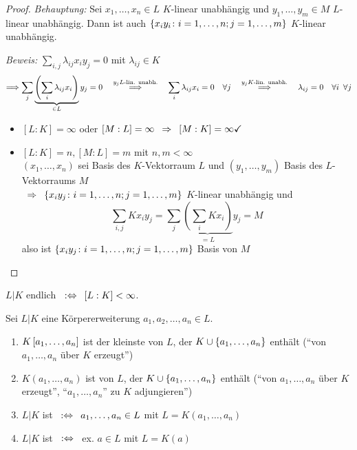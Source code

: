 \begin{proof}
    \textit{Behauptung:} Sei $x_1, \dots, x_n \in L$ $K$-linear unabhängig und $y_1, \dots, y_m \in M$ $L$-linear unabhängig. Dann ist auch $\left\{ x_i y_i \colon i = 1, \dots , n ; j = 1, \dots, m \right\}$ $K$-linear unabhängig.
    
    \textit{Beweis:} $\sum_{i,j} \lambda_{ij}x_i y_j = 0$ mit $\lambda_{ij} \in K$
    \begin{equation*}
        \Longrightarrow \sum_{j}\underbrace{\left( \sum_{i} \lambda_{ij}x_i \right)}_{\in L} y_j = 0 
        \quad \overset{y_j L\text{-lin. unabh.}}{\Longrightarrow} \quad \sum_{i} \lambda_{ij} x_i = 0 \quad \forall j
        \quad \overset{y_j K\text{-lin. unabh.}}{\Longrightarrow} \quad \lambda_{ij} = 0 \quad \forall i \enskip \forall j
    \end{equation*}
    
    \begin{itemize}[nolistsep, leftmargin=*]
        \item $[L:K] = \infty$ oder $[M:L] = \infty \enskip \Rightarrow \enskip [M:K] = \infty \checkmark$
        \item $[L:K] = n, [M:L] = m$ mit $n,m < \infty$ \\
        $(x_1, \dots, x_n)$ sei Basis des $K$-Vektorraum $L$ und $(y_1, \dots, y_m)$ Basis des $L$-Vektorraums $M$\\
        $\enskip \Rightarrow \enskip \left\{ x_i y_j \colon i = 1, \dots, n; j = 1, \dots, m \right\}$ $K$-linear unabhängig und
        \begin{equation*}
            \sum_{i,j} K x_i y_j = \sum_{j} \underbrace{\left( \sum_{i} K x_i \right)}_{=L} y_j = M
        \end{equation*}
        also ist $\left\{ x_i y_j \colon i = 1, \dots ,n ; j = 1, \dots, m \right\}$ Basis von $M$ 
    \end{itemize}
\end{proof}

\begin{definition}
    $L | K$ endlich $\enskip \mathrel{:\Leftrightarrow} \enskip [L:K] < \infty$.
\end{definition}

\begin{definition}
    Sei $L | K$ eine Körpererweiterung $a_1, a_2, \dots, a_n \in L$.
    \begin{enumerate}[leftmargin=*]
        \item $\polynom[K][a_1, \dots , a_n]$ ist der kleinste  von $L$, der $K \cup \left\{ a_1, \dots, a_n \right\}$ enthält (``von $a_1, \dots, a_n$ über $K$ erzeugt'')
        \item $K(a_1, \dots, a_n)$ ist  von $L$, der $K \cup \left\{ a_1, \dots, a_n \right\}$ enthält (``von $a_1, \dots, a_n$ über $K$ erzeugt'', ``$a_1, \dots, a_n$'' zu $K$ adjungieren'')
        \item $L | K$ ist  $\enskip \mathrel{:\Leftrightarrow} \enskip a_1, \dots , a_n \in L$ mit $L=K(a_1, \dots, a_n)$
        \item $L | K$ ist  $\enskip \mathrel{:\Leftrightarrow} \enskip$ ex. $a \in L$ mit $L=K(a)$
    \end{enumerate}
\end{definition}

